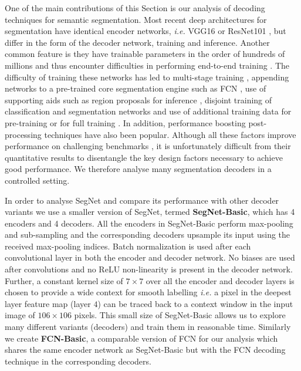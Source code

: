 One of the main contributions of this Section is our analysis of decoding techniques for semantic segmentation. Most recent deep architectures for segmentation have identical encoder networks, \textit{i.e.} VGG16 \citep{simonyan2014very} or ResNet101 \citep{he2016deep}, but differ in the form of the decoder network, training and inference. Another common feature is they have trainable parameters in the order of hundreds of millions and thus encounter difficulties in performing end-to-end training \citep{NohDeconvNets}. The difficulty of training these networks has led to multi-stage training \citep{long2015fully}, appending networks to a pre-trained core segmentation engine such as FCN \citep{CRFRNN}, use of supporting aids such as region proposals for inference \citep{NohDeconvNets}, disjoint training of classification and segmentation networks \citep{DecoupledNet} and use of additional training data for pre-training \citep{ParseNetRabinovich} \citep{mottaghi2014role} or for full training \citep{CRFRNN}. In addition, performance boosting post-processing techniques \citep{chen2016deeplab} have also been popular. Although all these factors improve performance on challenging benchmarks \citep{pascal}, it is unfortunately difficult from their quantitative results to disentangle the key design factors necessary to achieve good performance. We therefore analyse many segmentation decoders in a controlled setting.

In order to analyse SegNet and compare its performance with other decoder variants we use a smaller version of SegNet, termed \textbf{SegNet-Basic}, which has 4 encoders and 4 decoders. All the encoders in SegNet-Basic perform max-pooling and sub-sampling and the corresponding decoders upsample its input using the received max-pooling indices. Batch normalization is used after each convolutional layer in both the encoder and decoder network. No biases are used after convolutions and no ReLU non-linearity is present in the decoder network. Further, a constant kernel size of $7\times7$ over all the encoder and decoder layers is chosen to provide a wide context for smooth labelling \textit{i.e.} a pixel in the deepest layer feature map (layer $4$) can be traced back to a context window in the input image of $106\times106$ pixels. This small size of SegNet-Basic allows us to explore many different variants (decoders) and train them in reasonable time. Similarly we create \textbf{FCN-Basic}, a comparable version of FCN for our analysis which shares the same encoder network as SegNet-Basic but with the FCN decoding technique in the corresponding decoders.  

